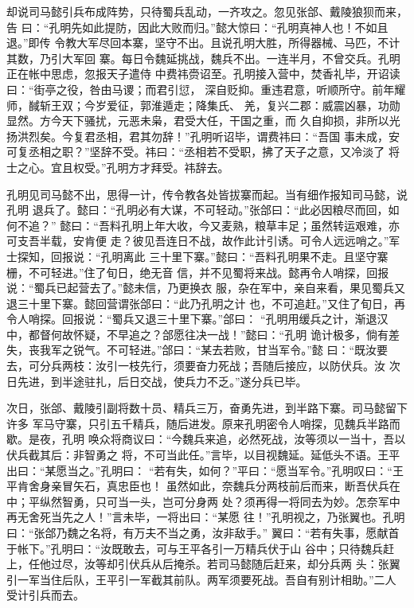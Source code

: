 却说司马懿引兵布成阵势，只待蜀兵乱动，一齐攻之。忽见张郃、戴陵狼狈而来，告
曰：“孔明先如此提防，因此大败而归。”懿大惊曰：“孔明真神人也！不如且退。”即传
令教大军尽回本寨，坚守不出。且说孔明大胜，所得器械、马匹，不计其数，乃引大军回
寨。每日令魏延挑战，魏兵不出。一连半月，不曾交兵。孔明正在帐中思虑，忽报天子遣侍
中费祎赍诏至。孔明接入营中，焚香礼毕，开诏读曰：“街亭之役，咎由马谡；而君引愆，
深自贬抑。重违君意，听顺所守。前年耀师，馘斩王双；今岁爱征，郭淮遁走；降集氏、
羌，复兴二郡：威震凶暴，功勋显然。方今天下骚扰，元恶未枭，君受大任，干国之重，而
久自抑损，非所以光扬洪烈矣。今复君丞相，君其勿辞！”孔明听诏毕，谓费祎曰：“吾国
事未成，安可复丞相之职？”坚辞不受。祎曰：“丞相若不受职，拂了天子之意，又冷淡了
将士之心。宜且权受。”孔明方才拜受。祎辞去。

孔明见司马懿不出，思得一计，传令教各处皆拔寨而起。当有细作报知司马懿，说孔明
退兵了。懿曰：“孔明必有大谋，不可轻动。”张郃曰：“此必因粮尽而回，如何不追？”
懿曰：“吾料孔明上年大收，今又麦熟，粮草丰足；虽然转运艰难，亦可支吾半载，安肯便
走？彼见吾连日不战，故作此计引诱。可令人远远哨之。”军士探知，回报说：“孔明离此
三十里下寨。”懿曰：“吾料孔明果不走。且坚守寨栅，不可轻进。”住了旬日，绝无音
信，并不见蜀将来战。懿再令人哨探，回报说：“蜀兵已起营去了。”懿未信，乃更换衣
服，杂在军中，亲自来看，果见蜀兵又退三十里下寨。懿回营谓张郃曰：“此乃孔明之计
也，不可追赶。”又住了旬日，再令人哨探。回报说：“蜀兵又退三十里下寨。”郃曰：
“孔明用缓兵之计，渐退汉中，都督何故怀疑，不早追之？郃愿往决一战！”懿曰：“孔明
诡计极多，倘有差失，丧我军之锐气。不可轻进。”郃曰：“某去若败，甘当军令。”懿
曰：“既汝要去，可分兵两枝：汝引一枝先行，须要奋力死战；吾随后接应，以防伏兵。汝
次日先进，到半途驻扎，后日交战，使兵力不乏。”遂分兵已毕。

次日，张郃、戴陵引副将数十员、精兵三万，奋勇先进，到半路下寨。司马懿留下许多
军马守寨，只引五千精兵，随后进发。原来孔明密令人哨探，见魏兵半路而歇。是夜，孔明
唤众将商议曰：“今魏兵来追，必然死战，汝等须以一当十，吾以伏兵截其后：非智勇之
将，不可当此任。”言毕，以目视魏延。延低头不语。王平出曰：“某愿当之。”孔明曰：
“若有失，如何？”平曰：“愿当军令。”孔明叹曰：“王平肯舍身亲冒矢石，真忠臣也！
虽然如此，奈魏兵分两枝前后而来，断吾伏兵在中；平纵然智勇，只可当一头，岂可分身两
处？须再得一将同去为妙。怎奈军中再无舍死当先之人！”言未毕，一将出曰：“某愿
往！”孔明视之，乃张翼也。孔明曰：“张郃乃魏之名将，有万夫不当之勇，汝非敌手。”
翼曰：“若有失事，愿献首于帐下。”孔明曰：“汝既敢去，可与王平各引一万精兵伏于山
谷中；只待魏兵赶上，任他过尽，汝等却引伏兵从后掩杀。若司马懿随后赶来，却分兵两
头：张翼引一军当住后队，王平引一军截其前队。两军须要死战。吾自有别计相助。”二人
受计引兵而去。

